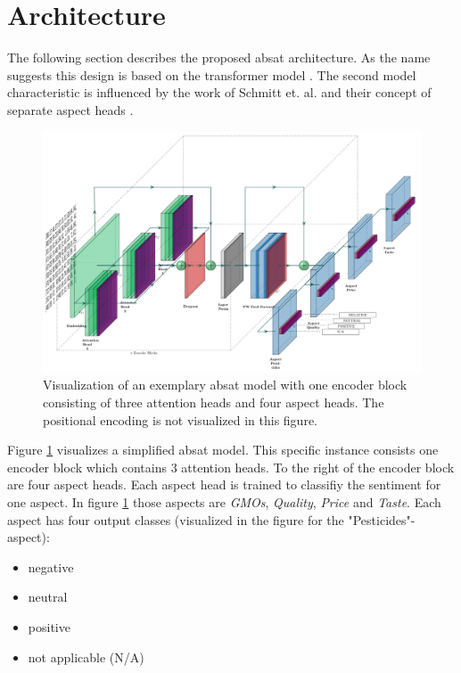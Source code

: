 \section{Architecture}

The following section describes the proposed \acrfull{absat} architecture. As the name suggests this design is based on the transformer model \cite{Vaswani2017}. The second model characteristic is influenced by the work of Schmitt et. al. and their concept of separate aspect heads \cite{Schmitt2018}.
\bigskip

\begin{figure}[htp]
	\centering
	\includegraphics[width=\textwidth]{figures/04_method/04_t-absa}
	\caption{Visualization of an exemplary \acrfull{absat} model with one encoder block consisting of three attention heads and four aspect heads. The positional encoding is not visualized in this figure.}
	\label{fig:04_t-absa}
\end{figure}

Figure \ref{fig:04_t-absa} visualizes a simplified \gls{absat} model. This specific instance consists one encoder block which contains 3 attention heads. To the right of the encoder block are four aspect heads. Each aspect head is trained to classifiy the sentiment for one aspect. In figure \ref{fig:04_t-absa} those aspects are \textit{GMOs}, \textit{Quality}, \textit{Price} and \textit{Taste}. Each aspect has four output classes {(visualized in the figure for the "Pesticides"-aspect)}:

\begin{itemize}
	\item negative
	\item neutral
	\item positive
	\item not applicable {(N/A)}
\end{itemize}

